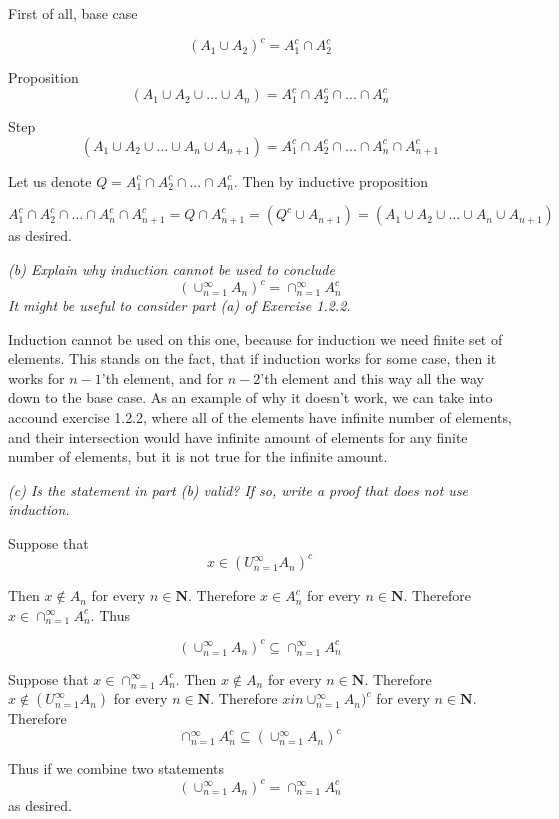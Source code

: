 \documentclass[11pt,oneside,titlepage]{book}
\begin{document}
First of all, base case

$$ (A_1 \cup A_2)^c = A^c_1 \cap A^c_2 $$

Proposition
$$ (A_1 \cup A_2 \cup ... \cup A_n) = A^c_1 \cap A^c_2 \cap ... \cap A^c_n$$

Step
$$ (A_1 \cup A_2 \cup ... \cup A_n \cup A_{n + 1}) = A^c_1 \cap A^c_2 \cap ... \cap A^c_n \cap A^c_{n + 1}$$

Let us denote $Q = A^c_1 \cap A^c_2 \cap ... \cap A^c_n$. Then by inductive
proposition

$$  A^c_1 \cap A^c_2 \cap ... \cap A^c_n \cap A^c_{n + 1} = Q \cap A^c_{n + 1}
= (Q^c \cup A_{n + 1}) = (A_1 \cup A_2 \cup ... \cup A_n \cup A_{n + 1})
$$
as desired.

\textit{(b) Explain why induction cannot be used to conclude }
$$(\cup^{\infty}_{n = 1}A_n)^c = \cap^{\infty}_{n = 1}A^c_n$$
\textit{It might be useful to consider part (a) of Exercise 1.2.2.}

Induction cannot be used on this one, because for induction we need finite
set of elements. This stands on the fact, that if induction works for
some case, then it works for $n - 1$'th element, and for $n - 2$'th element
and this way all the way down to the base case. As an example of why it doesn't
work, we can take into accound exercise 1.2.2, where all of the elements have
infinite number of elements, and their intersection would have infinite amount
of elements  for any finite number of elements, but it is not true for the
infinite amount.

\textit{(c) Is the statement in part (b) valid? If so, write a proof that does
  not use induction.}

Suppose that
$$x \in (U^{\infty}_{n = 1}A_n)^c$$

Then $x \notin A_n$ for every $n \in \textbf{N}$. Therefore $x \in A^c_n$ for every $n \in \textbf{N}$. Therefore $x \in \cap^{\infty}_{n = 1}A^c_n$. Thus

$$(\cup^{\infty}_{n = 1}A_n)^c \subseteq \cap^{\infty}_{n = 1}A^c_n$$

Suppose that $x \in \cap^{\infty}_{n = 1}A^c_n$. Then $x \notin A_n$ for every $n \in \textbf{N}$. Therefore $x \notin (U^{\infty}_{n = 1}A_n)$ for every $n \in \textbf{N}$. Therefore $x in \cup^{\infty}_{n = 1}A_n)^c$ for every $n \in \textbf{N}$. Therefore
$$ \cap^{\infty}_{n = 1}A^c_n \subseteq  (\cup^{\infty}_{n = 1}A_n)^c$$

Thus if we combine two statements
$$(\cup^{\infty}_{n = 1}A_n)^c = \cap^{\infty}_{n = 1}A^c_n$$
as desired.
\end{document}
